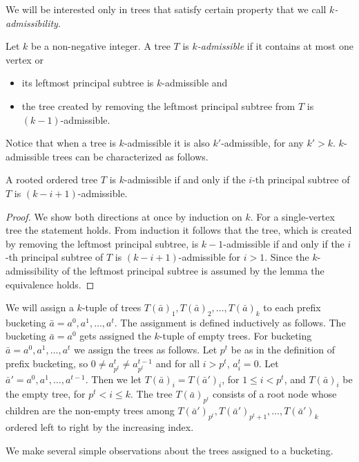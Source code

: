 \documentclass[runningheads,a4paper]{llncs}
\begin{document}
We will be interested only in trees that satisfy certain property that we call \emph{$k$-admissibility}.
\begin{definition}
\label{def:k-admissibility}
Let $k$ be a non-negative integer. A tree $T$ is \emph{$k$-admissible} if it contains at most one vertex or
\begin{itemize}
\item its leftmost principal subtree is $k$-admissible and
\item the tree created by removing the leftmost principal subtree from $T$ is $(k - 1)$-admissible.
\end{itemize}
\end{definition}
Notice that when a tree is $k$-admissible it is also $k'$-admissible, for any $k'>k$. $k$-admissible trees can be characterized as follows.
\begin{lemma}
\label{lm:k-admissibility}
A rooted ordered tree $T$ is $k$-admissible if and only if the $i$-th principal subtree of $T$ is $(k - i + 1)$-admissible.
\end{lemma}
\begin{proof}
We show both directions at once by induction on $k$.
For a single-vertex tree the statement holds.
From induction it follows that the tree, which is created by removing the leftmost principal subtree, is $k - 1$-admissible if and only if the $i$-th principal subtree of $T$ is $(k - i + 1)$-admissible for $i > 1$.
Since the $k$-admissibility of the leftmost principal subtree is assumed by the lemma the equivalence holds.
\end{proof}

We will assign a $k$-tuple of trees $T(\bar{a})_1,T(\bar{a})_2,\dots,T(\bar{a})_k$ to each prefix bucketing $\bar{a} = a^0,a^1,\dots,a^t$. The assignment is
defined inductively as follows. The bucketing $\bar{a} = a^0$ gets assigned the $k$-tuple of empty trees. For bucketing $\bar{a} = a^0,a^1,\dots,a^t$
we assign the trees as follows. Let $p^t$ be as in the definition of prefix bucketing, so $0 \not= a^t_{p^t} \not= a^{t-1}_{p^t}$ and for all $i>p^t$, $a^t_i = 0$.
Let $\bar{a}'=a^0,a^1,\dots,a^{t-1}$.
Then we let $T(\bar{a})_i = T(\bar{a}')_i$, for $1\le i < p^t$, and $T(\bar{a})_i$ be the empty tree, for $p^t < i \le k$. The tree $T(\bar{a})_{p^t}$ consists of
a root node whose children are the non-empty trees among $T(\bar{a}')_{p^t},T(\bar{a}')_{p^t+1},\dots,T(\bar{a}')_k$ ordered left to right by the increasing index.

We make several simple observations about the trees assigned to a bucketing. 
\end{document}
